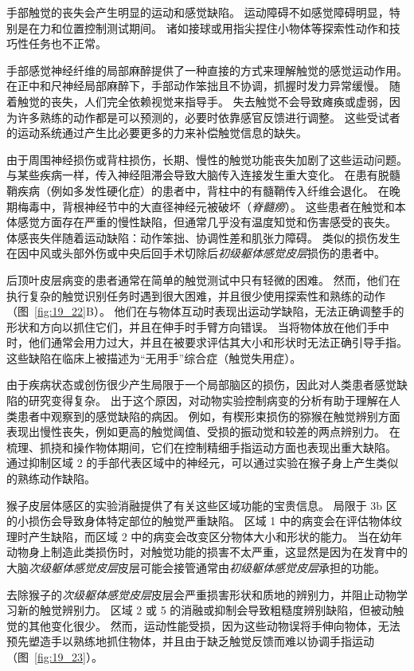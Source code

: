 手部触觉的丧失会产生明显的运动和感觉缺陷。
运动障碍不如感觉障碍明显，特别是在力和位置控制测试期间。
诸如接球或用指尖捏住小物体等探索性动作和技巧性任务也不正常。


手部感觉神经纤维的局部麻醉提供了一种直接的方式来理解触觉的感觉运动作用。
在正中和尺神经局部麻醉下，手部动作笨拙且不协调，抓握时发力异常缓慢。
随着触觉的丧失，人们完全依赖视觉来指导手。
失去触觉不会导致瘫痪或虚弱，因为许多熟练的动作都是可以预测的，必要时依靠感官反馈进行调整。
这些受试者的运动系统通过产生比必要更多的力来补偿触觉信息的缺失。


由于周围神经损伤或背柱损伤，长期、慢性的触觉功能丧失加剧了这些运动问题。
与某些疾病一样，传入神经阻滞会导致大脑传入连接发生重大变化。
在患有脱髓鞘疾病（例如多发性硬化症）的患者中，背柱中的有髓鞘传入纤维会退化。
在晚期梅毒中，背根神经节中的大直径神经元被破坏（\textit{脊髓痨}）。
这些患者在触觉和本体感觉方面存在严重的慢性缺陷，但通常几乎没有温度知觉和伤害感受的丧失。
体感丧失伴随着运动缺陷：动作笨拙、协调性差和肌张力障碍。
类似的损伤发生在因中风或头部外伤或中央后回手术切除后\textit{初级躯体感觉皮层}损伤的患者中。


后顶叶皮层病变的患者通常在简单的触觉测试中只有轻微的困难。
然而，他们在执行复杂的触觉识别任务时遇到很大困难，并且很少使用探索性和熟练的动作（图~\ref{fig:19_22}B）。
他们在与物体互动时表现出运动学缺陷，无法正确调整手的形状和方向以抓住它们，并且在伸手时手臂方向错误。 
当将物体放在他们手中时，他们通常会用力过大，并且在被要求评估其大小和形状时无法正确引导手指。
这些缺陷在临床上被描述为“无用手”综合症（触觉失用症）。


由于疾病状态或创伤很少产生局限于一个局部脑区的损伤，因此对人类患者感觉缺陷的研究变得复杂。
出于这个原因，对动物实验控制病变的分析有助于理解在人类患者中观察到的感觉缺陷的病因。
例如，有楔形束损伤的猕猴在触觉辨别方面表现出慢性丧失，例如更高的触觉阈值、受损的振动觉和较差的两点辨别力。
在梳理、抓挠和操作物体期间，它们在控制精细手指运动方面也表现出重大缺陷。
通过抑制区域 2 的手部代表区域中的神经元，可以通过实验在猴子身上产生类似的熟练动作缺陷。


猴子皮层体感区的实验消融提供了有关这些区域功能的宝贵信息。
局限于 3b 区的小损伤会导致身体特定部位的触觉严重缺陷。
区域 1 中的病变会在评估物体纹理时产生缺陷，而区域 2 中的病变会改变区分物体大小和形状的能力。
当在幼年动物身上制造此类损伤时，对触觉功能的损害不太严重，这显然是因为在发育中的大脑\textit{次级躯体感觉皮层}皮层可能会接管通常由\textit{初级躯体感觉皮层}承担的功能。


去除猴子的\textit{次级躯体感觉皮层}皮层会严重损害形状和质地的辨别力，并阻止动物学习新的触觉辨别力。
区域 2 或 5 的消融或抑制会导致粗糙度辨别缺陷，但被动触觉的其他变化很少。
然而，运动性能受损，因为这些动物误将手伸向物体，无法预先塑造手以熟练地抓住物体，并且由于缺乏触觉反馈而难以协调手指运动（图~\ref{fig:19_23}）。


